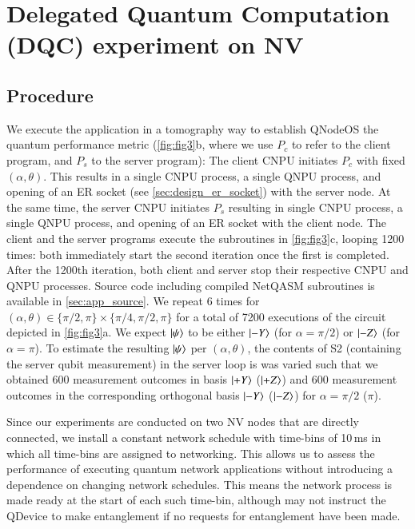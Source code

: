 \section{Delegated Quantum Computation (DQC) experiment on NV}
\label{sec:delcomp}

\subsection{Procedure}

We execute the application in a tomography way to establish \ac{QNodeOS} the quantum performance metric (\cref{fig:fig3}b, where we use $P_c$ to refer to the client program, and $P_s$ to the server program): The client \ac{CNPU} initiates $P_c$ with fixed $(\alpha, \theta)$. This results in a single \ac{CNPU} process, a single \ac{QNPU} process, and opening of an \ac{ER} socket (see \cref{sec:design_er_socket}) with the server node. At the same time, the server \ac{CNPU} initiates $P_s$ resulting in single \ac{CNPU} process, a single \ac{QNPU} process, and opening of an \ac{ER} socket with the client node. The client and the server programs execute the subroutines in \cref{fig:fig3}c, looping 1200 times: both immediately start the second iteration once the first is completed. After the 1200th iteration, both client and server stop their respective \ac{CNPU} and \ac{QNPU} processes. Source code including compiled NetQASM subroutines is available in \cref{sec:app_source}. We repeat 6 times for $(\alpha, \theta) \in \{\pi/2, \pi\} \times \{\pi/4, \pi/2, \pi\}$ for a total of 7200 executions of the circuit depicted in \cref{fig:fig3}a. We expect $\ket{\psi}$ to be either $\ket{-Y}$ (for $\alpha = \pi/2$) or $\ket{-Z}$ (for $\alpha = \pi$). To estimate the resulting $\ket{\psi}$ per $(\alpha, \theta)$, the contents of S2 (containing the server qubit measurement) in the server loop is was varied such that we obtained 600 measurement outcomes in basis $\ket{+Y}$ ($\ket{+Z}$) and 600 measurement outcomes in the corresponding orthogonal basis $\ket{-Y}$ ($\ket{-Z}$) for $\alpha = \pi/2$ ($\pi$).

Since our experiments are conducted on two \ac{NV} nodes that are directly connected, we install a constant network schedule with time-bins of 10\,ms in which all time-bins are assigned to networking. This allows us to assess the performance of executing quantum network applications without introducing a dependence on changing network schedules. This means the network process is made ready at the start of each such time-bin, although may not instruct the \ac{QDevice} to make entanglement if no requests for entanglement have been made.

